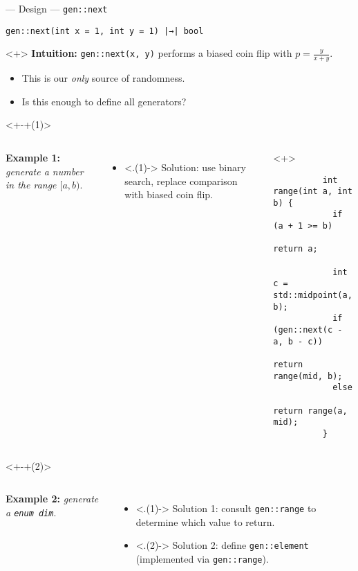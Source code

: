 \begin{frame}[fragile,t]{\halcheck{} --- Design --- \texttt{gen::next}}
  \begin{center}
    \texttt{gen::next(int x = 1, int y = 1) |→| bool}
  \end{center}

  \begin{onlyenv}<+>
    \textbf{Intuition:} \texttt{gen::next(x, y)} performs a biased coin flip with \( p = \frac{y}{x + y} \).

    \begin{itemize}
      \item This is our \emph{only} source of randomness.
      \item Is this enough to define all generators?
    \end{itemize}
  \end{onlyenv}

  \begin{onlyenv}<+-+(1)>
    \begin{columns}[T]
      \textbf{Example 1:} \emph{generate a number in the range $[a, b)$}.

      \begin{itemize}
        \item<.(1)-> Solution: use binary search, replace comparison with biased coin flip.
      \end{itemize}

      \begin{onlyenv}<+>
        \begin{verbatim}
          int range(int a, int b) {
            if (a + 1 >= b)
              return a;

            int c = std::midpoint(a, b);
            if (gen::next(c - a, b - c))
              return range(mid, b);
            else
              return range(a, mid);
          }
        \end{verbatim}
      \end{onlyenv}
    \end{columns}
  \end{onlyenv}

  \begin{onlyenv}<+-+(2)>
    \begin{columns}[T]
      \textbf{Example 2:} \emph{generate a \texttt{enum dim}}.

      \begin{itemize}
        \item<.(1)-> Solution 1: consult \texttt{gen::range} to determine which value to return.
        \item<.(2)-> Solution 2: define \texttt{gen::element} (implemented via \texttt{gen::range}).
      \end{itemize}


\end{columns}
\end{onlyenv}
\end{frame}
